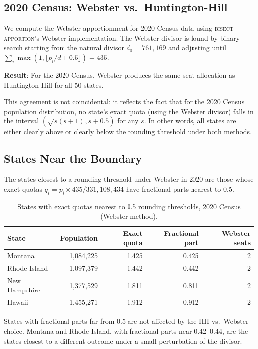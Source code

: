 \subsection{2020 Census: Webster vs.\ Huntington-Hill}

We compute the Webster apportionment for 2020 Census data using
\textsc{bisect-apportion}'s Webster implementation.
The Webster divisor is found by binary search starting from the natural
divisor $d_0 = 761{,}169$ and adjusting until
$\sum_i \max(1, \lfloor p_i/d + 0.5 \rfloor) = 435$.

\textbf{Result}: For the 2020 Census, Webster produces the same seat
allocation as Huntington-Hill for all 50 states.

This agreement is not coincidental: it reflects the fact that for the
2020 Census population distribution, no state's exact quota (using the
Webster divisor) falls in the interval $(\sqrt{s(s+1)}, s+0.5)$ for
any $s$.
In other words, all states are either clearly above or clearly below the
rounding threshold under both methods.

\subsection{States Near the Boundary}

The states closest to a rounding threshold under Webster in 2020 are
those whose exact quotas $q_i = p_i \times 435 / 331{,}108{,}434$
have fractional parts nearest to 0.5.

\begin{table}[h]
\centering
\caption{States with exact quotas nearest to 0.5 rounding thresholds,
  2020 Census (Webster method).}
\label{tab:near-boundary}
\begin{tabular}{lrrrr}
\toprule
State & Population & Exact quota & Fractional part & Webster seats \\
\midrule
Montana   & 1,084,225  & 1.425 & 0.425 & 2 \\
Rhode Island & 1,097,379 & 1.442 & 0.442 & 2 \\
New Hampshire & 1,377,529 & 1.811 & 0.811 & 2 \\
Hawaii    & 1,455,271  & 1.912 & 0.912 & 2 \\
\bottomrule
\end{tabular}
\begin{tablenotes}
\small
\item States with fractional parts far from 0.5 are not affected by the
  HH vs.\ Webster choice. Montana and Rhode Island, with fractional parts
  near 0.42--0.44, are the states closest to a different outcome under
  a small perturbation of the divisor.
\end{tablenotes}
\end{table}

